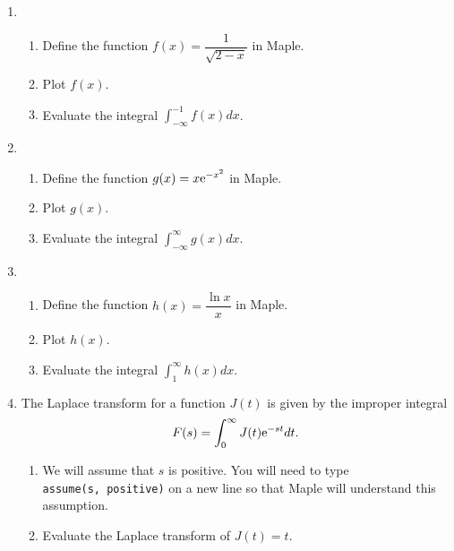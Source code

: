 \begin{enumerate}
    \item   
    \begin{enumerate} 
    	\item Define the function $f(x) = \dfrac{1}{\sqrt{2-x}}$ in Maple.
    	\item Plot $f(x)$.
    	\item Evaluate the integral $\displaystyle\int_{-\infty}^{-1} f(x) dx$.
    \end{enumerate}
    \item   
    \begin{enumerate} 
    	\item Define the function $g(x) = x{\rm e}^{-x^2}$ in Maple.
    	\item Plot $g(x)$.
    	\item Evaluate the integral $\displaystyle\int_{-\infty}^{\infty} g(x) dx$.
    \end{enumerate}
    
    \item 
    \begin{enumerate} 
    	\item Define the function $h(x) = \dfrac{\ln x}{x}$ in Maple.
    	\item Plot $h(x)$.
    	\item Evaluate the integral $\displaystyle\int_{1}^{\infty} h(x) dx$.
    \end{enumerate}
    \item   The Laplace transform for a function $J(t)$ is given by the improper integral 
    \[F(s) = \displaystyle\int_{0}^{\infty} J(t){\rm e}^{-st} dt.\]
    \begin{enumerate}
        \item We will assume that $s$ is positive. You will need to type \\
        \texttt{assume(s, positive)} on a new line so that Maple will understand this assumption.
        \item Evaluate the Laplace transform of $J(t) = t$.
    \end{enumerate}
\end{enumerate}
